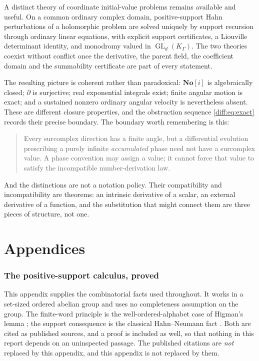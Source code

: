 \documentclass[11pt,letterpaper]{article}
\numberwithin{equation}{section}
\theoremstyle{definition}
\theoremstyle{remark}
\newcommand{\SC}{\mathbf{No}[i]}
\newcommand{\der}{\partial}
\newcommand{\GL}{\operatorname{GL}}
\begin{document}
A distinct theory of coordinate initial-value problems remains available and
useful. On a common ordinary complex domain, positive-support Hahn
perturbations of a holomorphic problem are solved uniquely by support
recursion through ordinary linear equations, with explicit support
certificates, a Liouville determinant identity, and monodromy valued in
$\GL_{d}(K_{\Gamma})$. The two theories coexist without conflict once the
derivative, the parent field, the coefficient domain and the summability
certificate are part of every statement.

The resulting picture is coherent rather than paradoxical: $\SC$ is
algebraically closed; $\der$ is surjective; real exponential integrals exist;
finite angular motion is exact; and a sustained nonzero ordinary angular
velocity is nevertheless absent. These are different closure properties, and
the obstruction sequence \cref{diff:eq:exact} records their precise boundary.
The boundary worth remembering is this:
\begin{quote}
Every surcomplex direction has a finite angle, but a differential evolution
prescribing a purely infinite \emph{accumulated} phase need not have a
surcomplex value. A phase convention may assign a value; it cannot force that
value to satisfy the incompatible number-derivation law.
\end{quote}
And the distinctions are not a notation policy. Their compatibility and
incompatibility are theorems: an intrinsic derivative of a scalar, an external
derivative of a function, and the substitution that might connect them are
three pieces of structure, not one.
\appendix
\part{Appendices}
\label{diff:part:appendices}

\section{The positive-support calculus, proved}
\label{diff:app:support}

This appendix supplies the combinatorial facts used throughout. It works in a
set-sized ordered abelian group and uses no completeness assumption on the
group. The finite-word principle is the well-ordered-alphabet case of Higman's
lemma \cite{Higman}; the support consequence is the classical Hahn--Neumann
fact \cite{Neumann}. Both are cited as published sources, and a proof is
included as well, so that nothing in this report depends on an uninspected
passage. The published citations are \emph{not} replaced by this appendix, and
this appendix is not replaced by them.
\end{document}

